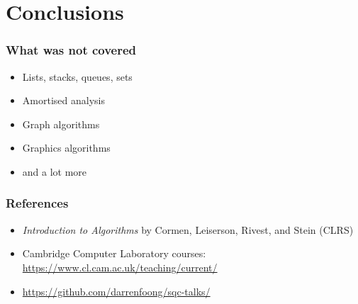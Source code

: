 \documentclass{beamer}
\begin{document}
\section{Conclusions}

\begin{frame}
 \frametitle{What was not covered}
 \begin{itemize}
  \item Lists, stacks, queues, sets
  \item Amortised analysis
  \item Graph algorithms
  \item Graphics algorithms
  \item and a lot more
 \end{itemize}
\end{frame}

\begin{frame}
 \frametitle{References}
 \begin{itemize}
  \item \emph{Introduction to Algorithms} by Cormen, Leiserson, Rivest, and Stein (CLRS)
  \item Cambridge Computer Laboratory courses: \url{https://www.cl.cam.ac.uk/teaching/current/}
  \item \url{https://github.com/darrenfoong/sqc-talks/}
 \end{itemize}
\end{frame}
\end{document}
